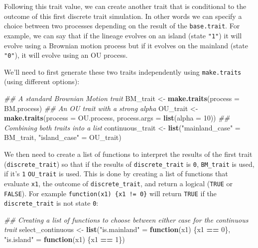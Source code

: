 \documentclass[
]{book}
\newenvironment{Shaded}{\begin{snugshade}}{\end{snugshade}}
\newcommand{\CommentTok}[1]{\textcolor[rgb]{0.56,0.35,0.01}{\textit{#1}}}
\newcommand{\ControlFlowTok}[1]{\textcolor[rgb]{0.13,0.29,0.53}{\textbf{#1}}}
\newcommand{\DataTypeTok}[1]{\textcolor[rgb]{0.13,0.29,0.53}{#1}}
\newcommand{\DecValTok}[1]{\textcolor[rgb]{0.00,0.00,0.81}{#1}}
\newcommand{\KeywordTok}[1]{\textcolor[rgb]{0.13,0.29,0.53}{\textbf{#1}}}
\newcommand{\NormalTok}[1]{#1}
\newcommand{\OperatorTok}[1]{\textcolor[rgb]{0.81,0.36,0.00}{\textbf{#1}}}
\newcommand{\StringTok}[1]{\textcolor[rgb]{0.31,0.60,0.02}{#1}}
\begin{document}
Following this trait value, we can create another trait that is conditional to the outcome of this first discrete trait simulation.
In other words we can specify a choice between two processes depending on the result of the \texttt{base.trait}.
For example, we can say that if the lineage evolves on an island (state \texttt{"1"}) it will evolve using a Brownian motion process but if it evolves on the mainland (state \texttt{"0"}), it will evolve using an OU process.

We'll need to first generate these two traits independently using \texttt{make.traits} (using different options):

\begin{Shaded}
\begin{Highlighting}[]
\CommentTok{\#\# A standard Brownian Motion trait}
\NormalTok{BM\_trait \textless{}{-}}\StringTok{ }\KeywordTok{make.traits}\NormalTok{(}\DataTypeTok{process =}\NormalTok{ BM.process)}
\CommentTok{\#\# An OU trait with a strong alpha}
\NormalTok{OU\_trait \textless{}{-}}\StringTok{ }\KeywordTok{make.traits}\NormalTok{(}\DataTypeTok{process =}\NormalTok{ OU.process, }\DataTypeTok{process.args =} \KeywordTok{list}\NormalTok{(}\DataTypeTok{alpha =} \DecValTok{10}\NormalTok{))}
\CommentTok{\#\# Combining both traits into a list}
\NormalTok{continuous\_trait \textless{}{-}}\StringTok{ }\KeywordTok{list}\NormalTok{(}\StringTok{"mainland\_case"}\NormalTok{ =}\StringTok{ }\NormalTok{BM\_trait,}
                         \StringTok{"island\_case"}\NormalTok{   =}\StringTok{ }\NormalTok{OU\_trait)}
\end{Highlighting}
\end{Shaded}

We then need to create a list of functions to interpret the results of the first trait (\texttt{discrete\_trait}) so that if the results of \texttt{discrete\_trait} is \texttt{0}, \texttt{BM\_trait} is used, if it's \texttt{1} \texttt{OU\_trait} is used.
This is done by creating a list of functions that evaluate \texttt{x1}, the outcome of \texttt{discrete\_trait}, and return a logical (\texttt{TRUE} or \texttt{FALSE}).
For example \texttt{function(x1)\ \{x1\ !=\ 0\}} will return \texttt{TRUE} if the \texttt{discrete\_trait} is not state \texttt{0}:

\begin{Shaded}
\begin{Highlighting}[]
\CommentTok{\#\# Creating a list of functions to choose between either case for the continuous trait}
\NormalTok{select\_continuous \textless{}{-}}\StringTok{ }\KeywordTok{list}\NormalTok{(}\StringTok{"is.mainland"}\NormalTok{ =}\StringTok{ }\ControlFlowTok{function}\NormalTok{(x1) \{x1 }\OperatorTok{==}\StringTok{ }\DecValTok{0}\NormalTok{\},}
                          \StringTok{"is.island"}\NormalTok{   =}\StringTok{ }\ControlFlowTok{function}\NormalTok{(x1) \{x1 }\OperatorTok{==}\StringTok{ }\DecValTok{1}\NormalTok{\})}
\end{Highlighting}
\end{Shaded}
\end{document}
